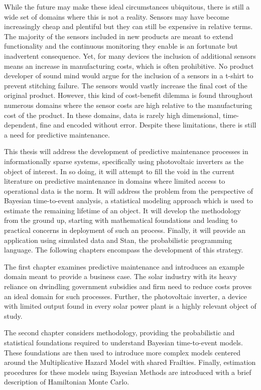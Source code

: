 While the future may make these ideal circumstances ubiquitous, there is still a wide set of domains where this is not a reality. Sensors may have become increasingly cheap and plentiful but they can still be expensive in relative terms. The majority of the sensors included in new products are meant to extend functionality and the continuous monitoring they enable is an fortunate but inadvertent consequence. Yet, for many devices the inclusion of additional sensors means an increase in manufacturing costs, which is often prohibitive. No product developer of sound mind would argue for the inclusion of a sensors in a t-shirt to prevent stitching failure. The sensors would vastly increase the final cost of the original product. However, this kind of cost-benefit dilemma is found throughout numerous domains where the sensor costs are high relative to the manufacturing cost of the product. In these domains, data is rarely high dimensional, time-dependent, fine and encoded without error. Despite these limitations, there is still a need for predictive maintenance. 

This thesis will address the development of predictive maintenance processes in informationally sparse systems, specifically using photovoltaic inverters as the object of interest. In so doing, it will attempt to fill the void in the current literature on predictive maintenance in domains where limited access to operational data is the norm. It will address the problem from the perspective of Bayesian time-to-event analysis, a statistical modeling approach which is used to estimate the remaining lifetime of an object. It will develop the methodology from the ground up, starting with mathematical foundations and leading to practical concerns in deployment of such an process. Finally, it will provide an application using simulated data and Stan, the probabilistic programming language. The following chapters encompass the development of this strategy. 

The first chapter examines predictive maintenance and introduces an example domain meant to provide a business case. The solar industry with its heavy reliance on dwindling government subsidies and firm need to reduce costs proves an ideal domain for such processes. Further, the photovoltaic inverter, a device with limited output found in every solar power plant is a highly relevant object of study. 

The second chapter considers methodology, providing the probabilistic and statistical foundations required to understand Bayesian time-to-event models. These foundations are then used to introduce more complex models centered around the Multiplicative Hazard Model with shared Frailties. Finally, estimation procedures for these models using Bayesian Methods are introduced with a brief description of Hamiltonian Monte Carlo. 

